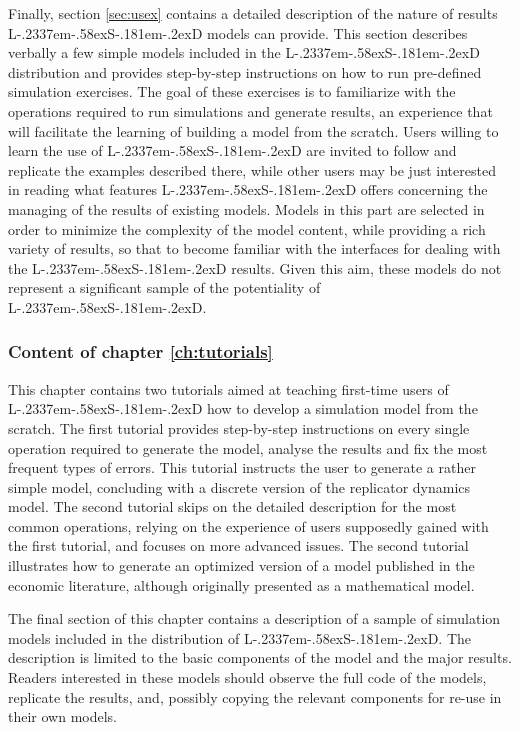 \documentclass [11pt,a4paper] {book}
\def\LsD{{L\kern-.2337em\lower-.58ex\hbox{S}\kern-.181em\lower-.2ex\hbox{D}}\xspace}
\begin{document}
Finally, section \ref{sec:usex} contains a detailed description of the nature of results \LsD models can provide. This section describes verbally a few simple models included in the \LsD distribution and provides step-by-step instructions on how to run pre-defined simulation exercises. The goal of these exercises is to familiarize with the operations required to run simulations and generate results, an experience that will facilitate the learning of building a model from the scratch. Users willing to learn the use of \LsD are invited to follow and replicate the examples described there, while other users may be just interested in reading what features \LsD offers concerning the managing of the results of existing models. Models in this part are selected in order to minimize the complexity of the model content, while providing a rich variety of results, so that to become familiar with the interfaces for dealing with the \LsD results. Given this aim, these models do not represent a significant sample of the potentiality of \LsD.

\subsubsection{Content of chapter \ref{ch:tutorials}}

This chapter contains two tutorials aimed at teaching first-time users of \LsD how to develop a simulation model from the scratch. The first tutorial provides step-by-step instructions on every single operation required to generate the model, analyse the results and fix the most frequent types of errors. This tutorial instructs the user to generate a rather simple model, concluding with a discrete version of the replicator dynamics model. The second tutorial skips on the detailed description for the most common operations, relying on the experience of users supposedly gained with the first tutorial, and focuses on more advanced issues. The second tutorial illustrates how to generate an optimized version of a model published in the economic literature, although originally presented as a mathematical model.

The final section of this chapter contains a description of a sample of simulation models included in the distribution of \LsD. The description is limited to the basic components of the model and the major results. Readers interested in these models should observe the full code of the models, replicate the results, and, possibly copying the relevant components for re-use in their own models.
\end{document}
